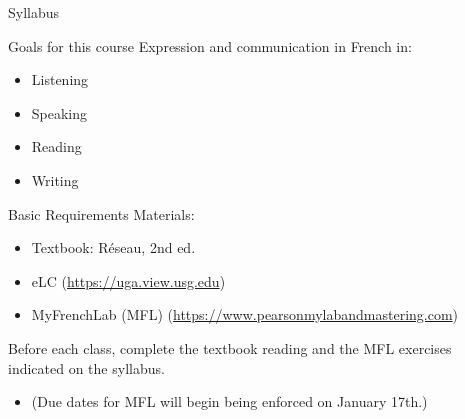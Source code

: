 \begin{frame}
  \begin{center}
    \Huge{Syllabus}
  \end{center}
\end{frame}

\begin{frame}{Goals for this course}
  Expression and communication in French in:
  \begin{itemize}
    \item Listening
    \item Speaking
    \item Reading
    \item Writing
  \end{itemize}
\end{frame}

\begin{frame}{Basic Requirements}
  Materials:
  \begin{itemize}
    \item Textbook: Réseau, 2nd ed.
    \item eLC (\url{https://uga.view.usg.edu})
    \item MyFrenchLab (MFL) (\url{https://www.pearsonmylabandmastering.com})
  \end{itemize}
  \alert{Before each class}, complete the textbook reading and the MFL exercises indicated on the syllabus.
  \begin{itemize}
    \item (Due dates for MFL will begin being enforced on January 17th.)
  \end{itemize}
\end{frame}

